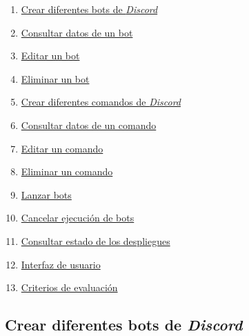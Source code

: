 \begin{enumerate}
	\item \href{https://github.com/harvestcore/matroos/issues/1}{Crear diferentes bots de \textit{Discord}}
	\item \href{https://github.com/harvestcore/matroos/issues/2}{Consultar datos de un bot}
	\item \href{https://github.com/harvestcore/matroos/issues/3}{Editar un bot}
	\item \href{https://github.com/harvestcore/matroos/issues/4}{Eliminar un bot}
	\item \href{https://github.com/harvestcore/matroos/issues/5}{Crear diferentes comandos de \textit{Discord}}
	\item \href{https://github.com/harvestcore/matroos/issues/6}{Consultar datos de un comando}
	\item \href{https://github.com/harvestcore/matroos/issues/7}{Editar un comando}
	\item \href{https://github.com/harvestcore/matroos/issues/8}{Eliminar un comando}
	\item \href{https://github.com/harvestcore/matroos/issues/9}{Lanzar bots}
	\item \href{https://github.com/harvestcore/matroos/issues/10}{Cancelar ejecución de bots}
	\item \href{https://github.com/harvestcore/matroos/issues/11}{Consultar estado de los despliegues}
	\item \href{https://github.com/harvestcore/matroos/issues/25}{Interfaz de usuario}
	\item \href{https://github.com/harvestcore/matroos/issues/39}{Criterios de evaluación}
\end{enumerate}


\subsection{Crear diferentes bots de \textit{Discord}}

